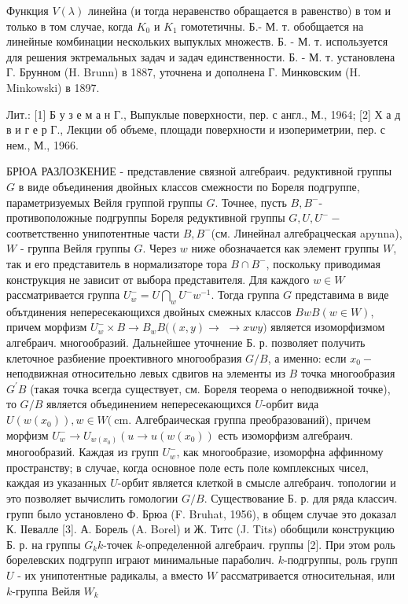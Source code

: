 \documentclass[10pt]{article}
\begin{document}
Функция $V(\lambda)$ линейна (и тогда неравенство обращается в равенство) в том и только в том случае, когда $K_{0}$ и $K_{1}$ гомотетичны. Б.- М. т. обобщается на линейные комбинации нескольких выпуклых множеств. Б. - М. т. используется для решения эктремальных задач и задач единственности. Б. - М. т. установлена Г. Брунном (H. Brunn) в 1887, уточнена и дополнена Г. Минковским (H. Minkowski) в 1897.



Лит.: [1] Б у з е м а н Г., Выпуклые поверхности, пер. с англ., М., 1964; [2] Х а д в и г е р Г., Лекции об объеме, площади поверхности и изопериметрии, пер. с нем., М., 1966.



БРЮА РАЗЛОЗКЕНИЕ - представление связной алгебраич. редуктивной группы $G$ в виде объединения двойных классов смежности по Бореля подгруппе, параметризуемых Вейля группой группы $G$. Точнее, пусть $B, B^{-}$- противоположные подгруппы Бореля редуктивной группы $G, U, U^{-}-$соответственно унипотентные части $B, B^{-}$(см. Линейнал алгебрацческая apynna), $W$ - группа Вейля группы $G$. Через $w$ ниже обозначается как элемент группы $W$, так и его представитель в нормализаторе тора $B \cap B^{-}$, поскольку приводимая конструкция не зависит от выбора представителя. Для каждого $w \in W$ рассматривается группа $U_{w}^{-}=U \bigcap_{w} U^{-} w^{-1}$. Тогда группа $G$ представима в виде обътдинения непересекающихся двойных смежных классов $B w B(w \in W)$, причем морфизм $U_{w}^{-} \times B \rightarrow B_{w} B((x, y) \rightarrow$ $\rightarrow x w y)$ является изоморфизмом алгебраич. многообразий. Дальнейшее уточнение Б. р. позволяет получить клеточное разбиение проективного многообразия $G / B$, а именно: если $x_{0}-$ неподвижная относительно левых сдвигов на элементы из $B$ точка многообразия $G^{\prime} B$ (такая точка всегда существует, см. Бореля теорема о неподвижной точке), то $G / B$ является объединением непересекающихся $U$-орбит вида $U\left(w\left(x_{0}\right)\right), w \in W(\mathrm{~cm}$. Алгебраическая группа преобразований), причем морфизм $U_{w}^{-} \rightarrow U_{w\left(x_{0}\right)}\left(u \rightarrow u\left(w\left(x_{0}\right)\right)\right.$ есть изоморфизм алгебраич. многообразий. Каждая из групп $U_{w}^{-}$, как многообразие, изоморфна аффинному пространству; в случае, когда основное поле есть поле комплексных чисел, каждая из указанных $U$-орбит является клеткой в смысле алгебраич. топологии и это позволяет вычислить гомологии $G / B$. Существование Б. р. для ряда классич. групп было установлено Ф. Брюа (F. Bruhat, 1956), в общем случае это доказал К. ІІевалле [3]. А. Борель (A. Borel) и Ж. Титс (J. Tits) обобщили конструкцию Б. р. на группы $G_{k} k$-точек $k$-определенной алгебраич. группы [2]. При этом роль борелевских подгрупп играют минимальные параболич. $k$-подгруппы, роль групп $U$ - их унипотентные радикалы, а вместо $W$ рассматривается относительная, или $k$-группа Вейля $W_{k}$
\end{document}
